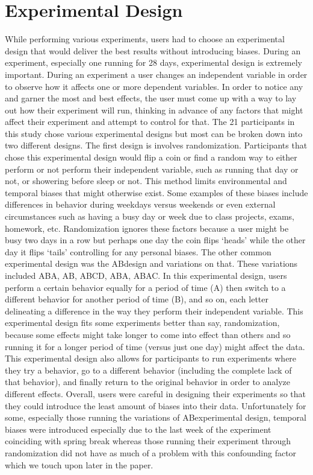 \section{Experimental Design}

While performing various experiments, users had to choose an experimental design that would deliver the best results without introducing biases. During an experiment, especially one running for 28 days, experimental design is extremely important. During an experiment a user changes an independent variable in order to observe how it affects one or more dependent variables. In order to notice any and garner the most and best effects, the user must come up with a way to lay out how their experiment will run, thinking in advance of any factors that might affect their experiment and attempt to control for that. The 21 participants in this study chose various experimental designs but most can be broken down into two different designs. 
    The first design is involves randomization. Participants that chose this experimental design would flip a coin or find a random way to either perform or not perform their independent variable, such as running that day or not, or showering before sleep or not. This method limits environmental and temporal biases that might otherwise exist. Some examples of these biases include differences in behavior during weekdays versus weekends or even external circumstances such as having a busy day or week due to class projects, exams, homework, etc. Randomization ignores these factors because a user might be busy two days in a row but perhaps one day the coin flips \enquote*{heads} while the other day it flips \enquote*{tails} controlling for any personal biases. 
    The other common experimental design was the AB\textunderscore\textunderscore  design and variations on that. These variations included ABA, AB, ABCD, ABA, ABAC. In this experimental design, users perform a certain behavior equally for a period of time (A) then switch to a different behavior for another period of time (B), and so on, each letter delineating a difference in the way they perform their independent variable. This experimental design fits some experiments better than say, randomization, because some effects might take longer to come into effect than others and so running it for a longer period of time (versus just one day) might affect the data. This experimental design also allows for participants to run experiments where they try a behavior, go to a different behavior (including the complete lack of that behavior), and finally return to the original behavior in order to analyze different effects. 
    Overall, users were careful in designing their experiments so that they could introduce the least amount of biases into their data. Unfortunately for some, especially those running the variations of AB\textunderscore\textunderscore  experimental design, temporal biases were introduced especially due to the last week of the experiment coinciding with spring break whereas those running their experiment through randomization did not have as much of a problem with this confounding factor which we touch upon later in the paper. 
